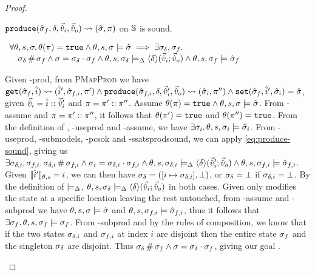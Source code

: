 \begin{proof}
\pfassume \begin{hypvlist}
 $\texttt{produce}(\hat{\sigma}_f,\delta,\vec{\hat{v}}_i,\vec{\hat{v}}_o)\rightsquigarrow (\hat{\sigma}, \pi)$
 \produce{} on $\mathbb S$ is sound.
\end{hypvlist}
\pfprove \begin{goalvlist}
 $\begin{array}{l}
\forall\theta,s,\sigma\ldotp \theta(\pi)=\texttt{true} \land \theta,s,\sigma\models\hat{\sigma} \implies \exists \sigma_\delta, \sigma_f\ldotp \\
\quad \sigma_\delta\operatorname{\#}\sigma_f \land \sigma=\sigma_\delta\cdot\sigma_f \land \theta,s,\sigma_\delta \models_{\Delta} \left<\delta\right>\!(\vec{\hat{v}}_i;\vec{\hat{v}}_o) \land \theta,s,\sigma_f \models \hat{\sigma}_f
\end{array}$
\end{goalvlist}

\pfcase{$\delta \in \preds_\mmdl$}

\begin{hypvlist}
 Given \hyp{prod}, from \textsc{PMapProd} we have $\texttt{get}(\hat{\sigma}_f,\hat{i})\rightsquigarrow(\hat{i}',\hat{\sigma}_{f,i},\pi') \land \texttt{produce}(\hat{\sigma}_{f,i},\delta,\vec{\hat{v}}_i',\vec{\hat{v}}_o)\rightsquigarrow (\hat{\sigma}_i,\pi'') \land \texttt{set}(\hat{\sigma}_f,\hat{i}',\hat{\sigma}_i)=\hat{\sigma}$, given $\vec{\hat{v}}_i=\hat{i}::\vec{\hat{v}}_i'$ and $\pi=\pi'::\pi''$.
 Assume $\theta(\pi)=\texttt{true} \land \theta,s,\sigma\models\hat{\sigma}$.
 From \hyp{assume} and $\pi=\pi'::\pi''$, it follows that $\theta(\pi')=\texttt{true}$ and $\theta(\pi'')=\texttt{true}$.
 From the definition of , \hyp{useprod} and \hyp{assume}, we have $\exists \sigma_i\ldotp \theta,s,\sigma_i\models \hat{\sigma}_i$.
 From \hyp{useprod}, \hyp{submodels}, \hyp{pcsok} and \hyp{ssatsprodsound}, we can apply \ref{eq:produce-sound}, giving us $\exists \sigma_{\delta,i}, \sigma_{f,i}\ldotp \sigma_{\delta,i}\operatorname{\#}\sigma_{f,i} \land \sigma_i=\sigma_{\delta,i}\cdot\sigma_{f,i} \land \theta,s,\sigma_{\delta,i}\models_{\Delta} \left<\delta\right>\!(\vec{\hat{v}}_i';\vec{\hat{v}}_o) \land \theta,s,\sigma_{f,i}\models\hat{\sigma}_{f,i}$.
 Given $\llbracket\hat{i}'\rrbracket_{\theta,s}=i$, we can then have $\sigma_\delta=([i\mapsto \sigma_{\delta,i}], \bot)$, or $\sigma_\delta=\bot$ if $\sigma_{\delta,i}=\bot$. By the definition of $\models_{\Delta}$, $\theta,s,\sigma_\delta\models_{\Delta}\left<\delta\right>\!(\vec{\hat{v}}_i;\vec{\hat{v}}_o)$ in both cases.
 Given  only modifies the state at a specific location leaving the rest untouched, from \hyp{assume} and \hyp{subprod} we have $\theta,s,\sigma\models\hat{\sigma}$ and $\theta,s,\sigma_{f,i}\models\hat{\sigma}_{f,i}$, thus it follows that $\exists \sigma_f\ldotp \theta,s,\sigma_f\models\sigma_f$.
 From \hyp{subprod} and by the rules of composition, we know that if the two states $\sigma_{\delta,i}$ and $\sigma_{f,i}$ at index $i$ are disjoint then the entire state $\sigma_f$ and the singleton $\sigma_\delta$ are disjoint. Thus $\sigma_\delta\operatorname{\#}\sigma_f\land\sigma=\sigma_\delta\cdot\sigma_f$, giving our goal .
\end{hypvlist}


\end{proof}

